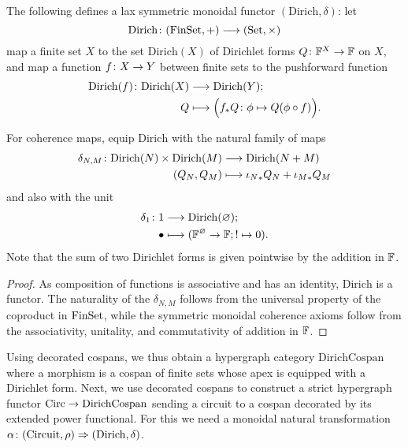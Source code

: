 \begin{proposition}
The following defines a lax symmetric monoidal functor
$(\mathrm{Dirich},\delta)$: let
\[
  \mathrm{Dirich}{\colon} (\mathrm{FinSet},+) \longrightarrow (\mathrm{Set},\times)
\]
map a finite set $X$ to the set $\mathrm{Dirich}(X)$ of Dirichlet forms
$Q{\colon} {\mathbb F}^X \to {\mathbb F}$ on $X$, and map a function $f{\colon} X \to Y$ between finite
sets to the pushforward function
\begin{align*}
  \mathrm{Dirich}(f){\colon} \mathrm{Dirich}(X) &\longrightarrow \mathrm{Dirich}(Y); \\
  Q &\longmapsto \Big(f_{\ast}Q{\colon} \phi \mapsto Q(\phi\circ f)\Big).
\end{align*}

For coherence maps, equip $\mathrm{Dirich}$ with the natural family of maps
\begin{align*}
  \delta_{N,M}{\colon} \mathrm{Dirich}(N) \times \mathrm{Dirich}(M) &\longrightarrow
  \mathrm{Dirich}(N+M) \\
  (Q_N,Q_M) &\longmapsto {\iota_N}_\ast Q_N+{\iota_M}_\ast Q_M
\end{align*}
and also with the unit
\begin{align*}
  \delta_1{\colon} 1 &\longrightarrow \mathrm{Dirich}(\varnothing);\\
  \bullet &\longmapsto ({\mathbb F}^\varnothing \to {\mathbb F}; ! \mapsto 0).
\end{align*}
Note that the sum of two Dirichlet forms is given pointwise by the addition in
${\mathbb F}$.
\end{proposition}
\begin{proof}
  As composition of functions is associative and has an identity,
  $\mathrm{Dirich}$ is a functor.  The naturality of the $\delta_{N,M}$ follows
  from the universal property of the coproduct in $\mathrm{FinSet}$, while the symmetric
  monoidal coherence axioms follow from the associativity, unitality, and
  commutativity of addition in ${\mathbb F}$.
\end{proof}


Using decorated cospans, we thus obtain a hypergraph category
$\mathrm{DirichCospan}$ where a morphism is a cospan of finite sets whose apex
is equipped with a Dirichlet form.  Next, we use decorated cospans to construct
a strict hypergraph functor $\mathrm{Circ} \to \mathrm{DirichCospan}$ sending a circuit
to a cospan decorated by its extended power functional. For this we need a
monoidal natural transformation $\alpha{\colon} (\mathrm{Circuit},\rho) \Rightarrow
(\mathrm{Dirich},\delta)$.

